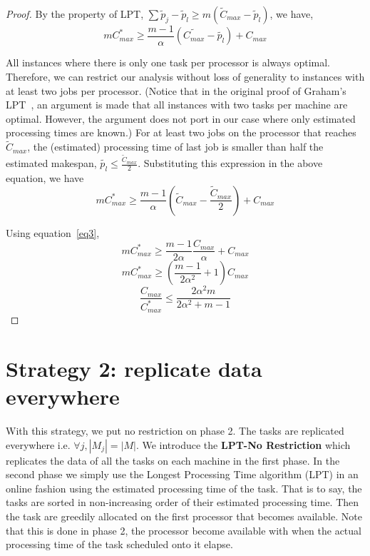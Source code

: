\documentclass[10pt, conference, compsocconf]{IEEEtran}
\begin{document}
\begin{proof}
 By the property of LPT, $\sum \tilde p_j-\tilde p_l \geq m (\tilde C_{max}-\tilde p_l)$, we have,
\begin{equation}\nonumber 
  m C_{max}^{*}\geq \frac{m-1}{\alpha } \left( \tilde{C_{max}} - \tilde{ p_l} \right) + {C_{max}}
 \end{equation}
 
 All instances where there is only one task per processor is always
 optimal. Therefore, we can restrict our analysis without loss of
 generality to instances with at least two jobs per processor. (Notice
 that in the original proof of Graham's LPT~\cite{Graham69boundson},
 an argument is made that all instances with two tasks per machine are
 optimal. However, the argument does not port in our case where only
 estimated processing times are known.) For at least two jobs on the
 processor that reaches $\tilde{C}_{max}$, the (estimated)
 processing time of last job is smaller than half the estimated
 makespan, $\tilde{p_l} \leq \frac{\tilde{C}_{max}}{2}$. Substituting
 this expression in the above equation, we have
\begin{equation}\nonumber
 m C_{max}^{*}\geq \frac{m-1}{\alpha } \left( \tilde C_{max}-\frac{\tilde C_{max}}{2} \right ) + {C_{max}}
\end{equation}

Using equation~\ref{eq3},
\begin{equation}\nonumber
 m C_{max}^{*}\geq \frac{m-1}{2\alpha } \frac{C_{max}} {\alpha} + {C_{max}}
\end{equation}
\begin{equation}\nonumber
 m C_{max}^{*}\geq \left( \frac{m-1}{2\alpha^{2} } +1\right){C_{max}}
\end{equation}
\begin{equation}\nonumber
\frac{C_{max}}{C_{max}^{*}}\leq \frac{2\alpha^{2}m}{2\alpha^{2}+ m-1}
\end{equation}
\end{proof} 

\section{Strategy 2: replicate data everywhere}\label{sec5}

With this strategy, we put no restriction on phase 2. The tasks are
replicated everywhere i.e. $\forall j, |M_{j}|=|M|$. We introduce the
\textbf{LPT-No Restriction} which replicates the data of all the tasks
on each machine in the first phase. In the second phase we simply use
the Longest Processing Time algorithm (LPT) in an online fashion using
the estimated processing time of the task. That is to say, the tasks
are sorted in non-increasing order of their estimated processing
time. Then the task are greedily allocated on the first
processor that becomes available. Note that this is done in phase 2,
the processor become available with when the actual processing time of
the task scheduled onto it elapse.
\end{document}
